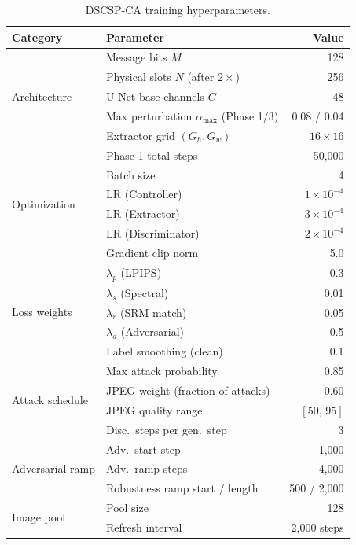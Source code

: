 \documentclass[journal]{IEEEtran}
\begin{document}
\begin{table}[t]
\centering
\caption{DSCSP-CA training hyperparameters.}
\label{tab:hyperparams}
\small
\begin{tabular}{@{}llr@{}}
\toprule
\textbf{Category} & \textbf{Parameter} & \textbf{Value} \\
\midrule
\multirow{5}{*}{Architecture}
    & Message bits $M$ & 128 \\
    & Physical slots $N$ (after $2\times$) & 256 \\
    & U-Net base channels $C$ & 48 \\
    & Max perturbation $\alpha_\text{max}$ (Phase 1/3) & 0.08 / 0.04 \\
    & Extractor grid $(G_h,G_w)$ & $16\times16$ \\
\midrule
\multirow{6}{*}{Optimization}
    & Phase 1 total steps & 50{,}000 \\
    & Batch size & 4 \\
    & LR (Controller) & $1\times10^{-4}$ \\
    & LR (Extractor) & $3\times10^{-4}$ \\
    & LR (Discriminator) & $2\times10^{-4}$ \\
    & Gradient clip norm & 5.0 \\
\midrule
\multirow{5}{*}{Loss weights}
    & $\lambda_p$ (LPIPS) & 0.3 \\
    & $\lambda_s$ (Spectral) & 0.01 \\
    & $\lambda_r$ (SRM match) & 0.05 \\
    & $\lambda_a$ (Adversarial) & 0.5 \\
    & Label smoothing (clean) & 0.1 \\
\midrule
\multirow{4}{*}{Attack schedule}
    & Max attack probability & 0.85 \\
    & JPEG weight (fraction of attacks) & 0.60 \\
    & JPEG quality range & $[50,\,95]$ \\
    & Disc.\ steps per gen.\ step & 3 \\
\midrule
\multirow{3}{*}{Adversarial ramp}
    & Adv.\ start step & 1{,}000 \\
    & Adv.\ ramp steps & 4{,}000 \\
    & Robustness ramp start / length & 500 / 2{,}000 \\
\midrule
\multirow{2}{*}{Image pool}
    & Pool size & 128 \\
    & Refresh interval & 2{,}000 steps \\
\bottomrule
\end{tabular}
\end{table}
\end{document}
